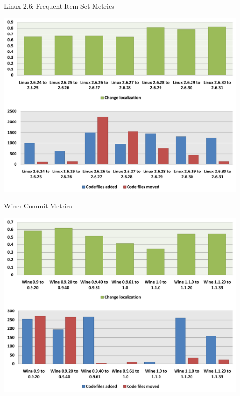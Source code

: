 
\begin{frame}{Linux 2.6: Frequent Item Set Metrics}

  \begin{center}
    \includegraphics[width=0.95\textwidth]{minings/linux-2-6-fis-metrics}
  \end{center}

\end{frame}


\begin{frame}{Wine: Commit Metrics}

  \begin{center}
    \includegraphics[width=0.95\textwidth]{minings/wine-commit-metrics}
  \end{center}

\end{frame}

